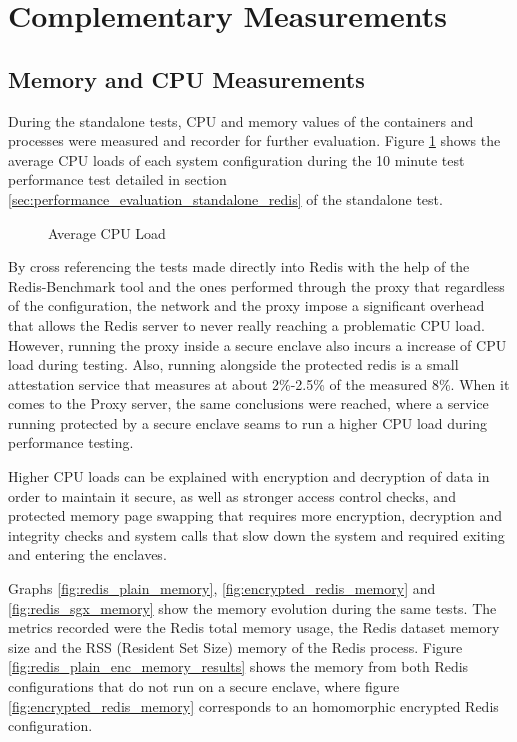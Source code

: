 \section{Complementary Measurements}
\label{sec:complementary_measurements}

\subsection{Memory and CPU Measurements}
\label{ssec:memory_and_cpu_measurements}

During the standalone tests, \gls{CPU} and memory values of the containers and processes were measured and recorder for further evaluation. Figure \ref{fig:average_cpu_load} shows the average \gls{CPU} loads of each system configuration during the 10 minute test performance test detailed in section \ref{sec:performance_evaluation_standalone_redis} of the standalone test.

\begin{figure}[htbp]
  \caption{Average CPU Load}
  \label{fig:average_cpu_load}
\end{figure}

By cross referencing the tests made directly into Redis with the help of the Redis-Benchmark tool and the ones performed through the proxy that regardless of the configuration, the network and the proxy impose a significant overhead that allows the Redis server to never really reaching a problematic \gls{CPU} load. However, running the proxy inside a secure enclave also incurs a increase of \gls{CPU} load during testing. Also, running alongside the protected redis is a small attestation service that measures at about 2\%-2.5\% of the measured 8\%. When it comes to the Proxy server, the same conclusions were reached, where a service running protected by a secure enclave seams to run a higher \gls{CPU} load during performance testing.

Higher \gls{CPU} loads can be explained with encryption and decryption of data in order to maintain it secure, as well as stronger access control checks, and protected memory page swapping that requires more encryption, decryption and integrity checks and system calls that slow down the system and required exiting and entering the enclaves.

Graphs \ref{fig:redis_plain_memory}, \ref{fig:encrypted_redis_memory} and \ref{fig:redis_sgx_memory} show the memory evolution during the same tests. The metrics recorded were the Redis total memory usage, the Redis dataset memory size and the \gls{RSS} (Resident Set Size) memory of the Redis process. Figure \ref {fig:redis_plain_enc_memory_results} shows the memory from both Redis configurations that do not run on a secure enclave, where figure \ref{fig:encrypted_redis_memory} corresponds to an homomorphic encrypted Redis configuration.

